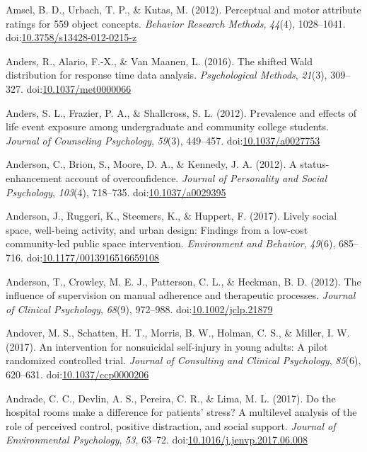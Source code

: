 \documentclass[english,man]{apa6}
\theoremstyle{definition}
\theoremstyle{definition}
\theoremstyle{definition}
\theoremstyle{remark}
\begin{document}
\hypertarget{ref-Amsel2012}{}
Amsel, B. D., Urbach, T. P., \& Kutas, M. (2012). Perceptual and motor
attribute ratings for 559 object concepts. \emph{Behavior Research
Methods}, \emph{44}(4), 1028--1041.
doi:\href{https://doi.org/10.3758/s13428-012-0215-z}{10.3758/s13428-012-0215-z}

\hypertarget{ref-Anders2016}{}
Anders, R., Alario, F.-X., \& Van Maanen, L. (2016). The shifted Wald
distribution for response time data analysis. \emph{Psychological
Methods}, \emph{21}(3), 309--327.
doi:\href{https://doi.org/10.1037/met0000066}{10.1037/met0000066}

\hypertarget{ref-Anders2012}{}
Anders, S. L., Frazier, P. A., \& Shallcross, S. L. (2012). Prevalence
and effects of life event exposure among undergraduate and community
college students. \emph{Journal of Counseling Psychology}, \emph{59}(3),
449--457. doi:\href{https://doi.org/10.1037/a0027753}{10.1037/a0027753}

\hypertarget{ref-Anderson2012a}{}
Anderson, C., Brion, S., Moore, D. A., \& Kennedy, J. A. (2012). A
status-enhancement account of overconfidence. \emph{Journal of
Personality and Social Psychology}, \emph{103}(4), 718--735.
doi:\href{https://doi.org/10.1037/a0029395}{10.1037/a0029395}

\hypertarget{ref-Anderson2017}{}
Anderson, J., Ruggeri, K., Steemers, K., \& Huppert, F. (2017). Lively
social space, well-being activity, and urban design: Findings from a
low-cost community-led public space intervention. \emph{Environment and
Behavior}, \emph{49}(6), 685--716.
doi:\href{https://doi.org/10.1177/0013916516659108}{10.1177/0013916516659108}

\hypertarget{ref-Anderson2012}{}
Anderson, T., Crowley, M. E. J., Patterson, C. L., \& Heckman, B. D.
(2012). The influence of supervision on manual adherence and therapeutic
processes. \emph{Journal of Clinical Psychology}, \emph{68}(9),
972--988.
doi:\href{https://doi.org/10.1002/jclp.21879}{10.1002/jclp.21879}

\hypertarget{ref-Andover2017}{}
Andover, M. S., Schatten, H. T., Morris, B. W., Holman, C. S., \&
Miller, I. W. (2017). An intervention for nonsuicidal self-injury in
young adults: A pilot randomized controlled trial. \emph{Journal of
Consulting and Clinical Psychology}, \emph{85}(6), 620--631.
doi:\href{https://doi.org/10.1037/ccp0000206}{10.1037/ccp0000206}

\hypertarget{ref-Andrade2017}{}
Andrade, C. C., Devlin, A. S., Pereira, C. R., \& Lima, M. L. (2017). Do
the hospital rooms make a difference for patients' stress? A multilevel
analysis of the role of perceived control, positive distraction, and
social support. \emph{Journal of Environmental Psychology}, \emph{53},
63--72.
doi:\href{https://doi.org/10.1016/j.jenvp.2017.06.008}{10.1016/j.jenvp.2017.06.008}
\end{document}
